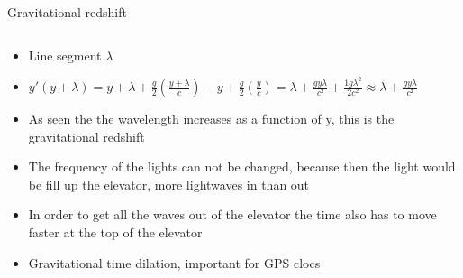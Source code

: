 \documentclass{beamer}
\begin{document}
\begin{frame}{Gravitational redshift}
  \begin{columns}
    \begin{column}{0.5\textwidth}
      \begin{itemize}
      \item{Line segment $\lambda$}
      \item{$y'(y+\lambda)=y+\lambda+\frac{g}{2}\left(\frac{y+\lambda}{c}\right)-y+\frac{g}{2}\left(\frac{y}{c}\right)=\lambda+\frac{gy\lambda}{c²}+\frac{1g\lambda^2}{2c^2}\approx \lambda+\frac{gy\lambda}{c²}$}

      \item{As seen the the wavelength increases as a function of y, this is the gravitational redshift}
      \item{The frequency of the lights can not be changed, because then the light would be fill up the elevator, more lightwaves in than out}
      \item{In order to get all the waves out of the elevator the time also has to move faster at the top of the elevator}
      \item{Gravitational time dilation, important for GPS clocs}
        

\end{itemize}
\end{column}
\end{columns}
\end{frame}
\end{document}
